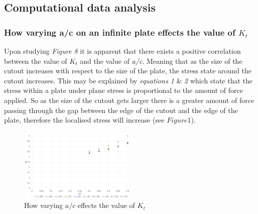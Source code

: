 \documentclass[11pt,twocolumn]{article} %
\begin{document}
\subsection{Computational data analysis}

\subsubsection{How varying a/c  on an infinite plate effects the value of $K_{t}$}

Upon studying \textit{Figure 8} it is apparent that there exists a positive correlation between the value of $K_{t}$ and the value of \textit{a/c}. Meaning that as the size of the cutout increases with respect to the size of the plate, the stress state around the cutout increases. This may be explained by \textit{equations 1} \& \textit{2} which state that the stress within a plate under plane stress is proportional to the amount of force applied. So as the size of the cutout gets larger there is a greater amount of force passing through the gap between the edge of the cutout and the edge of the plate, therefore the localised stress will increase (see $Figure 1$).
\begin{figure}[!ht]
	\centering
		\includegraphics[width=0.5\textwidth]{acKt.png}
	\caption{How varying $a/c$ effects the value of $K_{t}$}
\end{figure}
\end{document}
